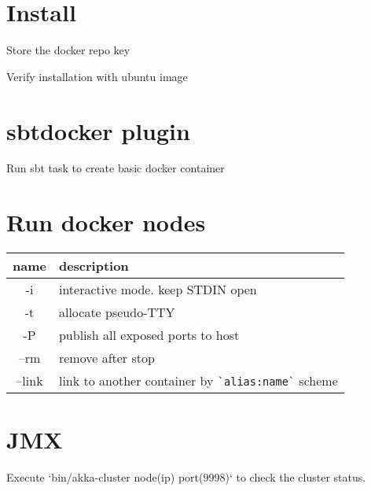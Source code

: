 \section*{Install}
Store the docker repo key


Verify installation with ubuntu image

\section*{sbt\-docker plugin}

Run sbt task to create basic docker container

\section*{Run docker nodes}

\begin{tabular}{|c|l|}
\hline
name & description\\ \hline
-i & interactive mode. keep STDIN open\\
-t & allocate pseudo-TTY\\
-P & publish all exposed ports to host\\
--rm & remove after stop\\
--link & link to another container by \lstinline|`alias:name`| scheme\\
\hline
\end{tabular}

\section*{JMX}

Execute `bin/akka-cluster node(ip) port(9998)` to check the cluster status.

